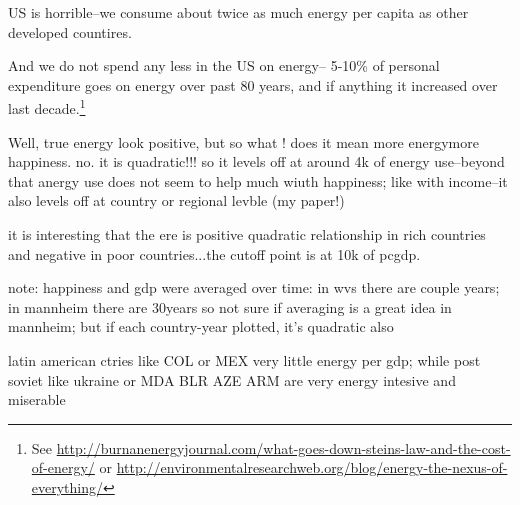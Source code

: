 \documentclass[10pt, letterpaper]{article}
\begin{document}
\begin{spacing}{1.4}
US is horrible--we consume about twice as much energy per capita as other
developed countires. %

And we do not spend any less in the US on energy-- 5-10\% of personal
expenditure goes on energy over past 80 years, and if anything it increased over
last decade.\footnote{See
  \url{http://burnanenergyjournal.com/what-goes-down-steins-law-and-the-cost-of-energy/}
or \url{http://environmentalresearchweb.org/blog/energy-the-nexus-of-everything/}}


Well, true energy look positive, but so what ! does it mean more energymore
happiness. no. it is quadratic!!! so it levels off at around 4k of energy
use--beyond that anergy use does not seem to help much wiuth happiness; like
with income--it also levels off at country or regional levble (my paper!)


it is interesting that the ere is positive quadratic relationship in rich
countries and negative in poor countries...the cutoff point is at 10k of pcgdp.

note: happiness and gdp were averaged over time: in wvs there are couple years;
in mannheim there are 30years so not sure if averaging is a great idea in
mannheim; but if each country-year plotted, it's quadratic also 


latin american ctries like COL or MEX very little energy per gdp; while post
soviet like ukraine or MDA BLR AZE ARM are very energy intesive and miserable



\end{spacing}
\end{document}
